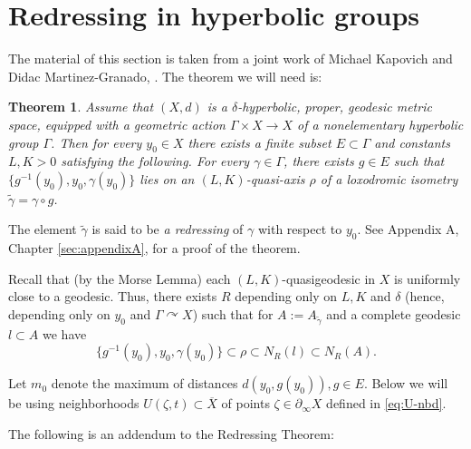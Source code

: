 \documentclass[12pt]{amsbook}%
\newtheorem{thm}{Theorem}[chapter]
\theoremstyle{definition}
\theoremstyle{remark}
\numberwithin{section}{chapter}
\numberwithin{subsection}{section}
\numberwithin{figure}{chapter}
\DeclareMathOperator{\acts}{\curvearrowright}
\def\Ga{\Gamma}
\def\ga{\gamma}
\def\geo{\partial_\infty}
\def\ol{\overline}
\begin{document}



\section{Redressing in hyperbolic groups}\label{sec:redressing}

The material of this section is taken from a joint work of Michael Kapovich and Didac Martinez-Granado, \cite{KM}. 
The theorem we will need is:

\begin{thm}
\label{thm:redressing}
Assume that $(X,d)$ is a $\delta$-hyperbolic, proper, geodesic metric space, equipped with a geometric action $\Gamma\times X\to X$   
of a nonelementary hyperbolic group $\Gamma$. Then for every $y_0\in X$ there exists a finite subset $E\subset \Gamma$ and constants $L, K>0$ satisfying the following.  For every $\ga\in \Gamma$, there exists $g\in E$ such that $\{g^{-1}(y_0), y_0, \gamma (y_0)\}$ lies on 
an $(L,K)$-quasi-axis $\rho$ of a loxodromic isometry $\tilde{\gamma}= \gamma\circ g$.   
\end{thm}

The element $\tilde{\ga}$ is said to be {\em a redressing} of $\ga$ with respect to $y_0$. See Appendix A, Chapter \ref{sec:appendixA}, for a proof of the theorem. 

\medskip
Recall that (by the Morse Lemma) each $(L,K)$-quasigeodesic in $X$ is uniformly close to a geodesic. Thus, there exists $R$ depending only on $L, K$ and $\delta$ (hence, depending only on $y_0$ and $\Ga\acts X$) such that for $A:= A_{\tilde\ga}$ and a  complete geodesic $l\subset A$ we have 
\begin{equation}\label{defi:R}
\{g^{-1}(y_0), y_0, \gamma (y_0)\}\subset \rho \subset N_R(l) \subset N_R(A).  
\end{equation}

Let $m_0$ denote the maximum of distances 
$d(y_0, g(y_0)), g\in E$. Below we will be using neighborhoods $U(\zeta, t)\subset \ol{X}$ of points $\zeta\in \geo X$ defined in 
\eqref{eq:U-nbd}.   

The following is   an addendum to the Redressing Theorem:
\end{document}
